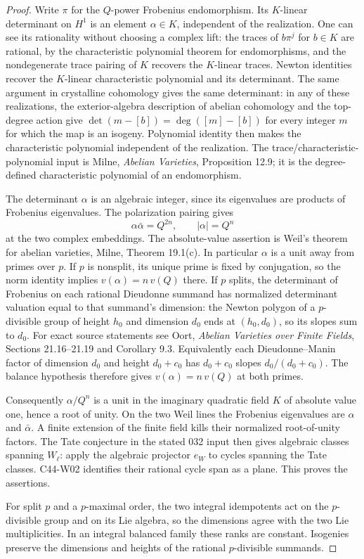 \begin{proof}
Write $\pi$ for the $Q$-power Frobenius endomorphism.  Its
$K$-linear determinant on $H^1$ is an element $\alpha\in K$,
independent of the realization.  One can see its rationality
without choosing a complex lift: the traces of $b\pi^j$ for
$b\in K$ are rational, by the characteristic polynomial theorem
for endomorphisms, and the nondegenerate trace pairing of $K$
recovers the $K$-linear traces.  Newton identities recover the
$K$-linear characteristic polynomial and its determinant.
The same argument in crystalline cohomology gives the same
determinant: in any of these realizations, the exterior-algebra
description of abelian cohomology and the top-degree action give
$\det(m-[b])=\deg([m]-[b])$ for every integer $m$ for which the
map is an isogeny.  Polynomial identity then makes the
characteristic polynomial independent of the realization.
The trace/characteristic-polynomial input is
Milne, \emph{Abelian Varieties}, Proposition 12.9; it is the
degree-defined characteristic polynomial of an endomorphism.

The determinant $\alpha$ is an algebraic integer, since its
eigenvalues are products of Frobenius eigenvalues.  The
polarization pairing gives
\[
 \alpha\bar\alpha=Q^{2n},\qquad |\alpha|=Q^n
\]
at the two complex embeddings.  The absolute-value assertion is
Weil's theorem for abelian varieties, Milne, Theorem 19.1(c).
In particular $\alpha$ is a unit away from primes over $p$.
If $p$ is nonsplit, its unique prime is fixed by conjugation, so
the norm identity implies
$v(\alpha)=n\,v(Q)$ there.  If $p$ splits, the determinant of
Frobenius on each rational Dieudonne summand has normalized
determinant valuation equal to that summand's dimension:
the Newton polygon of a $p$-divisible group of height $h_0$
and dimension $d_0$ ends at $(h_0,d_0)$, so its slopes sum
to $d_0$.  For exact source statements see Oort,
\emph{Abelian Varieties over Finite Fields}, Sections
21.16--21.19 and Corollary 9.3.  Equivalently each
Dieudonne--Manin factor of dimension $d_0$ and height
$d_0+c_0$ has $d_0+c_0$ slopes $d_0/(d_0+c_0)$.
The balance hypothesis therefore gives
$v(\alpha)=n\,v(Q)$ at both primes.

Consequently $\alpha/Q^n$ is a unit in the imaginary quadratic
field $K$ of absolute value one, hence a root of unity.  On the
two Weil lines the Frobenius eigenvalues are $\alpha$ and
$\bar\alpha$.  A finite extension of the finite field kills
their normalized root-of-unity factors.  The Tate conjecture
in the stated 032 input then gives algebraic classes spanning
$W_\ell$: apply the algebraic projector $e_W$ to cycles spanning
the Tate classes.  C44-W02 identifies their rational cycle
span as a plane.  This proves the assertions.

For split $p$ and a $p$-maximal order, the two integral
idempotents act on the $p$-divisible group and on its Lie
algebra, so the dimensions agree with the two Lie
multiplicities.  In an integral balanced family these ranks
are constant.  Isogenies preserve the dimensions and heights
of the rational $p$-divisible summands.
\end{proof}


